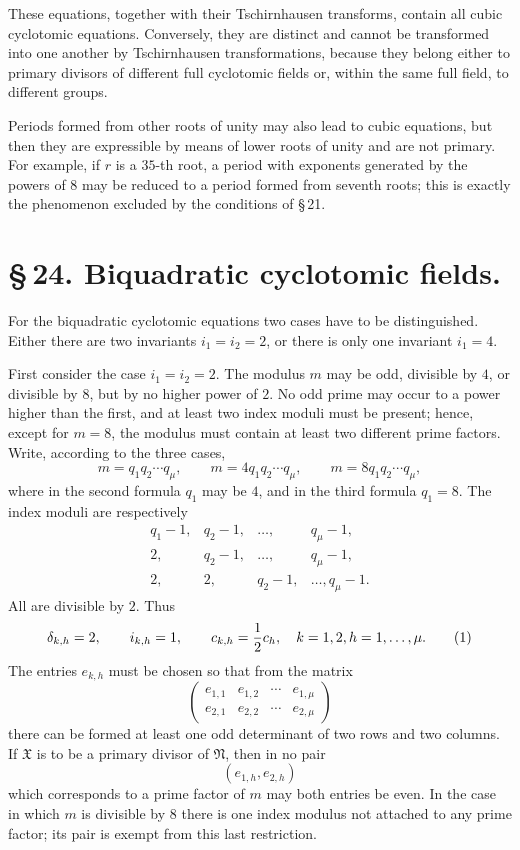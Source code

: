 \documentclass[11pt]{article}
\providecommand{\grpN}{\mathfrak N}
\providecommand{\grpX}{\mathfrak X}
\begin{document}
These equations, together with their Tschirnhausen transforms, contain all cubic cyclotomic equations.  Conversely, they are distinct and cannot be transformed into one another by Tschirnhausen transformations, because they belong either to primary divisors of different full cyclotomic fields or, within the same full field, to different groups.

Periods formed from other roots of unity may also lead to cubic equations, but then they are expressible by means of lower roots of unity and are not primary.  For example, if $r$ is a $35$-th root, a period with exponents generated by the powers of $8$ may be reduced to a period formed from seventh roots; this is exactly the phenomenon excluded by the conditions of \S\,21.

\section*{\S\,24. Biquadratic cyclotomic fields.}

For the biquadratic cyclotomic equations two cases have to be distinguished.  Either there are two invariants $i_1=i_2=2$, or there is only one invariant $i_1=4$.

First consider the case $i_1=i_2=2$.  The modulus $m$ may be odd, divisible by $4$, or divisible by $8$, but by no higher power of $2$.  No odd prime may occur to a power higher than the first, and at least two index moduli must be present; hence, except for $m=8$, the modulus must contain at least two different prime factors.  Write, according to the three cases,
\[
   m=q_1q_2\cdots q_\mu,
   \qquad
   m=4q_1q_2\cdots q_\mu,
   \qquad
   m=8q_1q_2\cdots q_\mu,
\]
where in the second formula $q_1$ may be $4$, and in the third formula $q_1=8$.  The index moduli are respectively
\[
\begin{array}{cccc}
q_1-1,& q_2-1,&\ldots,&q_\mu-1,\\
2,& q_2-1,&\ldots,&q_\mu-1,\\
2,&2,&q_2-1,&\ldots,
q_\mu-1.
\end{array}
\]
All are divisible by $2$.  Thus
\begin{equation}
   \delta_{k,h}=2,
   \qquad i_{k,h}=1,
   \qquad c_{k,h}=\frac12 c_h,
   \quad k=1,2,\\ h=1,\ldots,\mu .
   \tag{1}
\end{equation}
The entries $e_{k,h}$ must be chosen so that from the matrix
\begin{equation}
\begin{pmatrix}
 e_{1,1}&e_{1,2}&\cdots&e_{1,\mu}\\
 e_{2,1}&e_{2,2}&\cdots&e_{2,\mu}
\end{pmatrix}
\tag{2}
\end{equation}
there can be formed at least one odd determinant of two rows and two columns.  If $\grpX$ is to be a primary divisor of $\grpN$, then in no pair
\[
   (e_{1,h},e_{2,h})
\]
which corresponds to a prime factor of $m$ may both entries be even.  In the case in which $m$ is divisible by $8$ there is one index modulus not attached to any prime factor; its pair is exempt from this last restriction.
\end{document}

